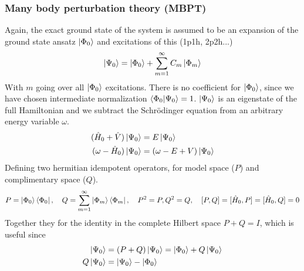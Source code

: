 \documentclass[
11pt,notheorems,hyperref={pdfauthor=whatever}
]{beamer}
\begin{document}
\begin{frame}
    \frametitle{Many body perturbation theory (MBPT)}
    Again, the exact ground state of the system is assumed to be an expansion of the ground state ansatz $\ket{\Phi_0}$ and excitations of this (1p1h, 2p2h...)
    \begin{align*}
        \ket{\Psi_0} = \ket{\Phi_0} + \sum_{m=1}^{\infty}C_m \ket{\Phi_m}
    \end{align*}
    With $m$ going over all $\ket{\Phi_0}$ excitations. There is no coefficient for $\ket{\Phi_0}$, since we have chosen intermediate normalization $\braket{\Phi_0 | \Psi_0} = 1$. $\ket{\Psi_0}$ is an eigenstate of the full Hamiltonian and we subtract the Schr\"{o}dinger equation from an arbitrary energy variable $\omega$. 
    \begin{align*}
        (\hat{H}_0 + \hat{V})\ket{\Psi_0} &= E \ket{\Psi_0} \\
        (\omega - \hat{H}_0)\ket{\Psi_0} &= (\omega-E+V)\ket{\Psi_0}
    \end{align*} 
    Defining two hermitian idempotent operators, for model space ($P$) and complimentary space ($Q$).
    \begin{align*}
        P = \ket{\Phi_0}\bra{\Phi_0}, \hspace{10px} Q = \sum_{m=1}^\infty \ket{\Phi_m}\bra{\Phi_m},\hspace{10px} P^2 = P, Q^2 = Q,\hspace{10px} [P,Q] = [\hat{H}_0, P] = [\hat{H}_0, Q] = 0
    \end{align*}
    Together they for the identity in the complete Hilbert space $P + Q = I$, which is useful since
    \begin{align*}
        \ket{\Psi_0} &= (P+Q)\ket{\Psi_0} = \ket{\Phi_0} + Q\ket{\Psi_0} \\
        Q\ket{\Psi_0} &= \ket{\Psi_0} - \ket{\Phi_0} 
    \end{align*}  
\end{frame}
\end{document}
